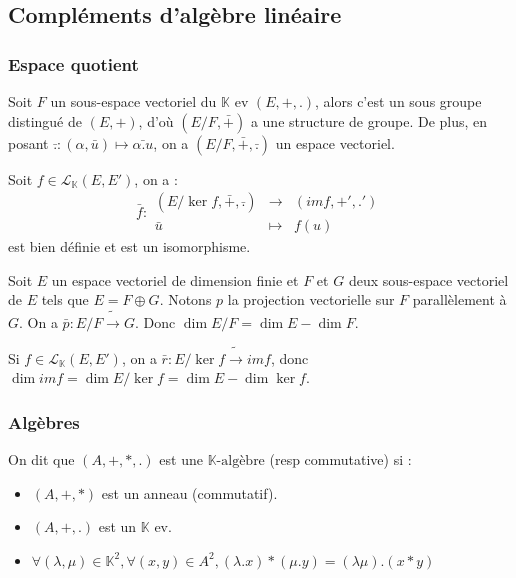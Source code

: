 \newcommand{\sem}{\overset{s}{\sim}}

\subsection{Compléments d'algèbre linéaire}
\subsubsection{Espace quotient}
\begin{defi}
    Soit $F$ un sous-espace vectoriel du $\mathbb{K}$ ev $(E, +, .)$, alors c'est un sous groupe distingué de $(E, +)$, d'où $(E/F, \bar{+})$ a une structure de groupe. De plus, en posant $\bar{.} : (\alpha, \bar{u}) \mapsto \bar{\alpha.u}$, on a $(E/F, \bar{+}, \bar{.})$ un espace vectoriel.
\end{defi}

\begin{theo} Soit $f \in \mathscr{L}_\mathbb{K}(E,E')$, on a :
    \[ \bar{f} : \begin{array}{ccc} \left(E/\ker f, \bar{+}, \bar{.}\right) & \rightarrow & \left(im f, +', .'\right) \\ \bar{u} & \mapsto & f(u) \end{array} \]
    est bien définie et est un isomorphisme.
\end{theo}

\begin{prop} Soit $E$ un espace vectoriel de dimension finie et $F$ et $G$ deux sous-espace vectoriel de $E$ tels que $E = F \oplus G$. Notons $p$ la projection vectorielle sur $F$ parallèlement à $G$. On a $\bar{p} : E/F \tilde{\rightarrow} G$. Donc $\dim E/F = \dim E - \dim F$.
\end{prop}

\begin{prop} Si $f\in\mathscr{L}_\mathbb{K}(E,E')$, on a $\bar{r} : E/\ker f \tilde{\rightarrow} im f$, donc $\dim im f = \dim E/\ker f = \dim E - \dim \ker f$.
\end{prop}

\subsubsection{Algèbres}
\begin{defi} On dit que $(A, +, *, .)$ est une $\mathbb{K}\text{-algèbre}$ (resp commutative) si :\begin{itemize}
    \item $(A, +, *)$ est un anneau (commutatif).
    \item $(A, +, .)$ est un $\mathbb{K}$ ev.
    \item $\forall (\lambda, \mu) \in \mathbb{K}^2, \forall (x, y)\in A^2, (\lambda.x) * (\mu.y) = (\lambda\mu).(x*y)$
\end{itemize}\end{defi}

